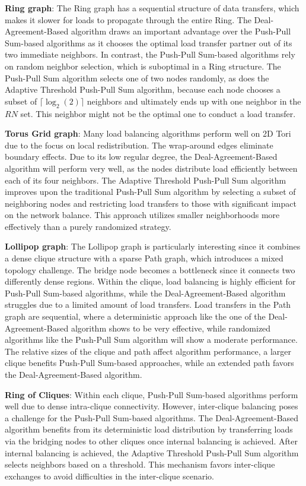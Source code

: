 \textbf{Ring graph}: The Ring graph has a sequential structure of data transfers, which makes it slower for loads to propagate through the entire Ring. The Deal-Agreement-Based algorithm draws an important advantage over the Push-Pull Sum-based algorithms as it chooses the optimal load transfer partner out of its two immediate neighbors. In contrast, the Push-Pull Sum-based algorithms rely on random neighbor selection, which is suboptimal in a Ring structure. The Push-Pull Sum algorithm selects one of two nodes randomly, as does the Adaptive Threshold Push-Pull Sum algorithm, because each node chooses a subset of $\lceil \log_{2}{(2)} \rceil$ neighbors and ultimately ends up with one neighbor in the $RN$ set. This neighbor might not be the optimal one to conduct a load transfer.

\textbf{Torus Grid graph}: Many load balancing algorithms perform well on 2D Tori due to the focus on local redistribution. The wrap-around edges eliminate boundary effects. Due to its low regular degree, the Deal-Agreement-Based algorithm will perform very well, as the nodes distribute load efficiently between each of its four neighbors. The Adaptive Threshold Push-Pull Sum algorithm improves upon the traditional Push-Pull Sum algorithm by selecting a subset of neighboring nodes and restricting load transfers to those with significant impact on the network balance. This approach utilizes smaller neighborhoods more effectively than a purely randomized strategy.

\textbf{Lollipop graph}: The Lollipop graph is particularly interesting since it combines a dense clique structure with a sparse Path graph, which introduces a mixed topology challenge. The bridge node becomes a bottleneck since it connects two differently dense regions. Within the clique, load balancing is highly efficient for Push-Pull Sum-based algorithms, while the Deal-Agreement-Based algorithm struggles due to a limited amount of load transfers. Load transfers in the Path graph are sequential, where a deterministic approach like the one of the Deal-Agreement-Based algorithm shows to be very effective, while randomized algorithms like the Push-Pull Sum algorithm will show a moderate performance. The relative sizes of the clique and path affect algorithm performance, a larger clique benefits Push-Pull Sum-based approaches, while an extended path favors the Deal-Agreement-Based algorithm.

\textbf{Ring of Cliques}: Within each clique, Push-Pull Sum-based algorithms perform well due to dense intra-clique connectivity. However, inter-clique balancing poses a challenge for the Push-Pull Sum-based algorithms. The Deal-Agreement-Based algorithm benefits from its deterministic load distribution by transferring loads via the bridging nodes to other cliques once internal balancing is achieved. After internal balancing is achieved, the Adaptive Threshold Push-Pull Sum algorithm selects neighbors based on a threshold. This mechanism favors inter-clique exchanges to avoid difficulties in the inter-clique scenario.